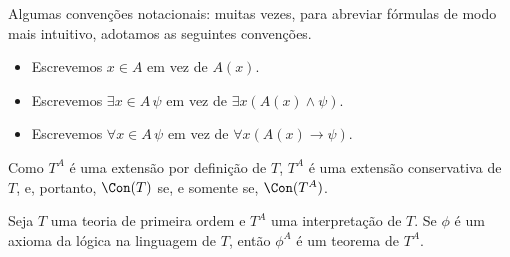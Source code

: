 \begin{metadefinition}
    Algumas convenções notacionais: muitas vezes, para abreviar fórmulas de modo mais intuitivo, adotamos as seguintes convenções.

    \begin{itemize}
        \item Escrevemos $x\in A$ em vez de $A(x)$.
        \item Escrevemos $\exists x\in A\,\psi$ em vez de $\exists x (A(x)\wedge \psi)$.
        \item Escrevemos $\forall x\in A\,\psi$ em vez de $\forall x (A(x)\to \psi)$.
    \end{itemize}
\end{metadefinition}

Como $T^A$ é uma extensão por definição de $T$, $T^A$ é uma extensão conservativa de $T$, e, portanto, $\Con(T)$ se, e somente se, $\Con(T^A)$.

\begin{metalemma}\label{mlem:axiomasLogicosInterpretacao}
    Seja $T$ uma teoria de primeira ordem e $T^A$ uma interpretação de $T$.
    Se $\phi$ é um axioma da lógica na linguagem de $T$, então
    $\phi^A$ é um teorema de $T^A$.
\end{metalemma}

